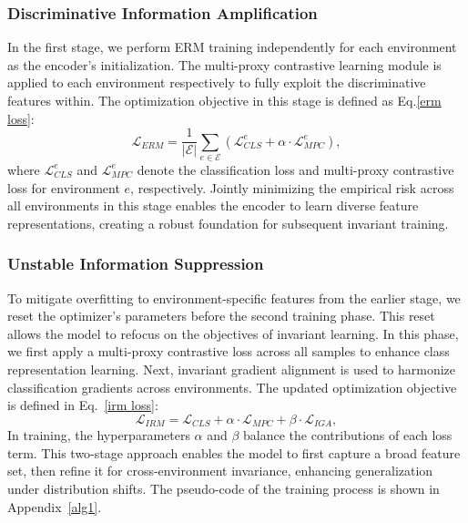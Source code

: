 \subsubsection{Discriminative Information Amplification}
In the first stage, we perform ERM training independently for each environment as the encoder's initialization. The multi-proxy contrastive learning module is applied to each environment respectively to fully exploit the discriminative features within. The optimization objective in this stage is defined as Eq.\ref{erm loss}:
\begin{equation}
\label{erm loss}
\mathcal{L}_{ERM} = \frac{1}{|\mathcal{E}|} \sum_{e \in \mathcal{E}} (\mathcal{L}_{CLS}^e + \alpha \cdot \mathcal{L}_{MPC}^e),
\end{equation}
where $\mathcal{L}_{CLS}^e$ and $\mathcal{L}_{MPC}^e$ denote the classification loss and multi-proxy contrastive loss for environment $e$, respectively. Jointly minimizing the empirical risk across all environments in this stage enables the encoder to learn diverse feature representations, creating a robust foundation for subsequent invariant training.

\subsubsection{Unstable Information Suppression}
To mitigate overfitting to environment-specific features from the earlier stage, we reset the optimizer’s parameters before the second training phase. This reset allows the model to refocus on the objectives of invariant learning. In this phase, we first apply a multi-proxy contrastive loss across all samples to enhance class representation learning. Next, invariant gradient alignment is used to harmonize classification gradients across environments. The updated optimization objective is defined in Eq.~\ref{irm loss}:
\begin{equation}
\label{irm loss}
\mathcal{L}_{IRM} = \mathcal{L}_{CLS} + \alpha \cdot \mathcal{L}_{MPC} + \beta \cdot \mathcal{L}_{IGA},
\end{equation}
In training, the hyperparameters $\alpha$ and $\beta$ balance the contributions of each loss term. This two-stage approach enables the model to first capture a broad feature set, then refine it for cross-environment invariance, enhancing generalization under distribution shifts. The pseudo-code of the training process is shown in Appendix~\ref{alg1}.

% 







